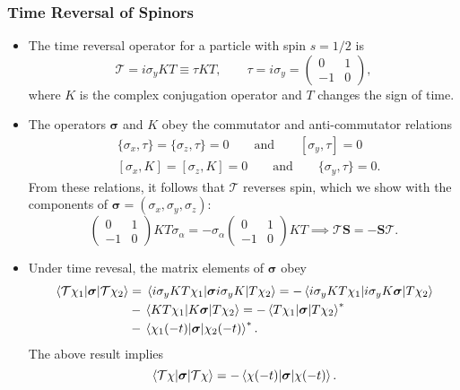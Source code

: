 \documentclass[11pt, a4paper]{article}
\newcommand{\eqtext}[1]{\qquad \text{#1} \qquad}
\renewcommand{\vec}[1]{\bm{#1}}  %
\renewcommand{\S}{\vec{S}}  %
\newcommand{\T}{\mathcal{T}}  %
\begin{document}
\subsubsection{Time Reversal of Spinors}
\begin{itemize}
	\item The time reversal operator for a particle with spin $ s = 1/2 $ is 
	\begin{equation*}
		\T = i \sigma_{y} KT \equiv \tau KT, \qquad \tau = i \sigma_{y} =
		\begin{pmatrix}
			0 & 1\\
			-1 & 0
		\end{pmatrix},
	\end{equation*}
	where $ K $ is the complex conjugation operator and $ T $ changes the sign of time. 

    \item The operators $ \vec{\sigma} $ and $ K $ obey the commutator and anti-commutator relations
	\begin{align*}
		&\{\sigma_{x}, \tau\} = \{\sigma_{z}, \tau\} = 0 \eqtext{and} [\sigma_{y}, \tau] = 0\\
		&[\sigma_{x}, K] = [\sigma_{z}, K] = 0 \eqtext{and} \{\sigma_{y}, \tau\} = 0.
	\end{align*}
	From these relations, it follows that $ \T $ reverses spin, which we show with the components of $ \vec{\sigma} = (\sigma_{x}, \sigma_{y}, \sigma_{z}) $:
	\begin{equation*}
		\begin{pmatrix}
			0 & 1\\
			-1 & 0
		\end{pmatrix}
		K T \sigma_{\alpha} = - \sigma_{\alpha}
		\begin{pmatrix}
			0 & 1\\
			-1 & 0
		\end{pmatrix}
		KT
		\implies \T \S = - \S \T.
	\end{equation*}
	
	\item Under time revesal, the matrix elements of $ \vec{\sigma} $ obey
	\begin{align*}
		\mel{\T \chi_{1}}{\vec{\sigma}}{\T \chi_{2}} &= \mel{i\sigma_{y}KT\chi_{1}}{\vec{\sigma}i \sigma_{y}K}{T\chi_{2}} = - \mel{i\sigma_{y}KT\chi_{1}}{i \sigma_{y}K \vec{\sigma}}{T\chi_{2}} \\
		& - \mel{KT\chi_{1}}{K \vec{\sigma}}{T\chi_{2}} = -\mel{T\chi_{1}}{\vec{\sigma}}{T\chi_{2}}^{*}\\
		& -\mel{\chi_{1}(-t)}{\vec{\sigma}}{\chi_{2}(-t)}^{*}.
	\end{align*}
	The above result implies
	\begin{equation*}
		\mel{\T \chi}{\vec{\sigma}}{\T \chi} = -\mel{\chi(-t)}{\vec{\sigma}}{\chi(-t)}.
	\end{equation*}
	

\end{itemize}
\end{document}
